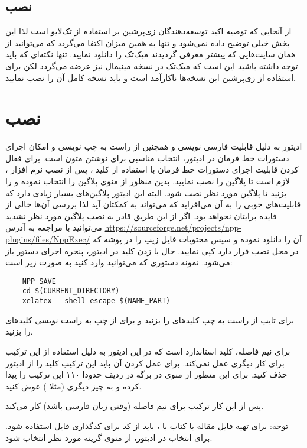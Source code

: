     \subsection{نصب  }
        از آنجایی که توصیه اکید توسعه‌دهندگان زی‌پرشین بر استفاده از تک‌لایو است لذا این بخش خیلی توضیح داده نمی‌شود و تنها به همین میزان 
        اکتفا می‌گردد که می‌توانید از همان سایت‌هایی که پیشتر معرفی گردیدند میک‌تک را دانلود نمایید. تنها نکته‌ای که باید توجه داشته باشید این است 
        که میک‌تک در نسخه‌ مینیمال نیز عرضه می‌گردد لکن برای استفاده از زی‌پرشین این نسخه‌ها ناکارآمد است و باید نسخه کامل آن را نصب نمایید. 
        

    \section{نصب }
    ادیتور   به دلیل قابلیت فارسی نویسی و همچنین از راست به چپ نویسی و امکان اجرای دستورات خط فرمان در ادیتور،
    انتخاب مناسبی برای نوشتن متون  است. برای فعال کردن قابلیت اجرای دستورات خط فرمان با استفاده از کلید ، پس از نصب نرم افزار ، 
    لازم است تا پلاگین  را نصب نمایید. بدین منظور از منوی     
    پلاگین   را انتخاب نموده و  را بزنید تا پلاگین مورد نظر نصب شود. البته این ادیتور پلاگین‌های بسیار زیادی دارد 
    که قابلیت‌های خوبی را به آن می‌افزاید که می‌تواند به کمکتان آید لذا بررسی آن‌ها خالی از فایده برایتان نخواهد بود.
    اگر از این طریق قادر به نصب پلاگین مورد نظر نشدید می‌توانید با مراجعه به آدرس \url{https://sourceforge.net/projects/npp-plugins/files/NppExec/}
    آن را دانلود نموده و سپس محتویات فایل زیپ را  در پوشه  که در محل نصب   قرار دارد کپی نمایید. 
    حال با زدن کلید   در ادیتور، پنجره اجرای دستور باز می‌شود.
    نمونه دستوری که می‌توانید وارد کنید به صورت زیر است:

    \begin{Verbatim}
    NPP_SAVE
    cd $(CURRENT_DIRECTORY)
    xelatex --shell-escape $(NAME_PART)
    \end{Verbatim}

    برای تایپ از راست به چپ کلیدهای   را بزنید و برای از چپ به راست نویسی کلیدهای   را بزنید.

    برای نیم فاصله، کلید استاندارد   است که در این ادیتور به دلیل استفاده از این ترکیب برای کار دیگری عمل نمی‌کند.
    برای عمل کردن آن باید این ترکیب کلید را از ادیتور حذف کنید. برای این منظور از منوی 
     در برگه   در ردیف حدودا ۱۱۰  این ترکیب را پیدا کرده و به چیز دیگری (مثلا ) عوض کنید.

     پس از این کار ترکیب   برای نیم فاصله (وقتی زبان فارسی باشد) کار می‌کند.
     
     توجه: برای تهیه فایل مقاله یا کتاب با \lr{\XePersian}، باید از کد   برای کدگذاری فایل استفاده شود. برای انتخاب در ادیتور، از منوی
       گزینه مورد نظر انتخاب شود.
